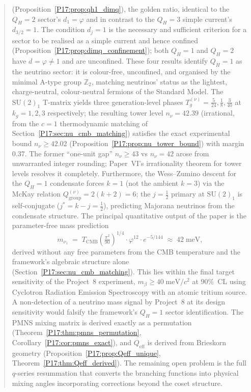 \documentclass[11pt,a4paper]{article}
\theoremstyle{definition}\newtheorem{definition}[theorem]{Definition}
\theoremstyle{remark}
\newcommand{\vp}{\varphi}
\newcommand{\TCMB}{T_{\mathrm{CMB}}}
\newcommand{\SU}{\mathrm{SU}}
\newcommand{\QH}{Q_H}
\newcommand{\Ztwo}{\mathbb{Z}_2}
\newcommand{\dimq}[1]{d_{#1}}
\begin{document}
\begin{abstract}
(Proposition~\ref{P17:prop:qh1_dimq}), the golden ratio, identical to the
$\QH=2$ sector's $\dimq{1}=\vp$ and in contrast to the $\QH=3$ simple
current's $\dimq{3/2}=1$. The condition $\dimq{j}=1$ is the necessary
and sufficient criterion for a sector to be realised as a simple
current and hence confined (Proposition~\ref{P17:prop:dimq_confinement});
both $\QH=1$ and $\QH=2$ have $\dimq{}=\vp\ne1$ and are unconfined.
These four results identify $\QH=1$ as the neutrino sector: it is
colour-free, unconfined, and organised by the minimal A-type group
$\Ztwo$, matching neutrinos' status as the lightest, charge-neutral,
colour-neutral fermions of the Standard Model. The $\SU(2)_1$
T-matrix yields three generation-level phases
$T_g^{(\nu)}=\tfrac{5}{24},\tfrac{1}{8},\tfrac{3}{40}$ at
$k_g=1,2,3$ respectively; the resulting tower level $n_\nu=42.39$
(irrational, from the $c=1$ thermodynamic matching of
Section~\ref{P17:sec:nu_cmb_matching}) satisfies the exact experimental
bound $n_\nu\geq42.02$ (Proposition~\ref{P17:prop:nu_tower_bound}) with
margin~$0.37$. The former ``one-unit gap'' $n_\nu\geq43$ vs
$n_\nu=42$ arose from unwarranted integer rounding; Paper~VI's
irrationality theorem for tower levels resolves it completely.
Furthermore, the Wess--Zumino descent for the $\QH=1$ condensate
forces $k=1$ (not the ambient $k=3$) via the McKay relation
$Q_{\mathrm{group}}^{(\nu)}=2(k+2)=6$; the $j=\tfrac12$ primary at
$\mathrm{SU}(2)_1$ is self-conjugate ($j^*=k-j=\tfrac12$), predicting
Majorana neutrinos from the condensate structure.
The principal quantitative output of the paper is the parameter-free
mass prediction
\begin{equation*}
  m_{\nu_1} \;=\; \TCMB\!\left(\tfrac{\pi^2}{90}\right)^{1/4}
  \cdot\vp^{12}\cdot e^{-5/144}
  \;\approx\; 42\;\mathrm{meV},
\end{equation*}
derived without any free parameters from the CMB temperature and the
framework's algebraic structure alone
(Section~\ref{P17:sec:nu_cmb_matching}).  This lies within the final
target sensitivity of the Project~8 experiment,
$m_\beta\geq40\;\mathrm{meV}/c^2$ at $90\%$~CL using Cyclotron
Radiation Emission Spectroscopy with an atomic tritium source.
A non-detection of a neutrino mass signal by Project~8 at its design
sensitivity would falsify the framework's $\QH=1$ sector identification.
The PMNS mixing matrix is derived exactly as a permutation
(Theorem~\ref{P17:thm:pmns_permutation}, Corollary~\ref{P17:cor:pmns_exact}),
and $Q_{\mathrm{eff}}$ is derived from Brieskorn geometry
(Proposition~\ref{P17:prop:Qeff_unique}, Theorem~\ref{P17:thm:Qeff_derived}).
The remaining open problem is the full $q$-series resummation that
converts the branching functions into physical mixing angles
incorporating corrections beyond the coset structure.
\end{abstract}
\end{document}
